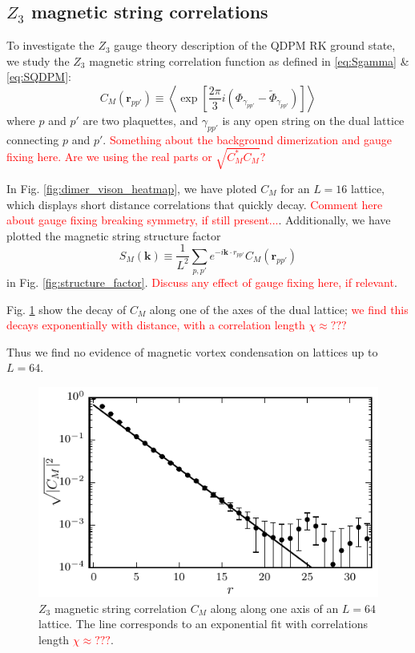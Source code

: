 \documentclass[twocolumn,prb,aps,floatfix,superscriptaddress]{revtex4-1}
\newcommand{\figref}[1]{Fig. \ref{#1}}
\newcommand{\note}[1]{\textcolor{red}{#1}}
\begin{document}
\subsection{$Z_3$ magnetic string correlations}

To investigate the $Z_3$ gauge theory description of the QDPM RK ground state, we study the $Z_3$ magnetic string correlation function as defined in \eqref{eq:Sgamma} \& \eqref{eq:SQDPM}:
\begin{equation}
C_M \left( \bm{r}_{pp'} \right) \equiv \left \langle \exp \left[ \frac{2 \pi}{3} i \left( \Phi_{\gamma_{pp'}} -\tilde{\Phi}_{\gamma_{pp'}} \right) \right] \right \rangle
\end{equation}
where $p$ and $p'$ are two plaquettes, and $\gamma_{pp'}$ is any open string on the dual lattice connecting $p$ and $p'$. \note{Something about the background dimerization and gauge fixing here. Are we using the real parts or $\sqrt{C_M^*C_M}$?}

In \figref{fig:dimer_vison_heatmap}, we have ploted $C_M$ for an $L=16$ lattice, which displays short distance correlations that quickly decay. \note{Comment here about gauge fixing breaking symmetry, if still present...}. Additionally, we have plotted the magnetic string structure factor
\begin{equation}
S_M\left( \bm{k} \right) \equiv \frac{1}{ L^2} \sum_{p,p'} e^{-i \bm{k} \cdot r_{pp'}} C_M\left( \bm{r}_{pp'}\right)
\end{equation}
in \figref{fig:structure_factor}. \note{Discuss any effect of gauge fixing here, if relevant}. 

\figref{fig:vison_cor} show the decay of $C_M$ along one of the axes of the dual lattice; \note{we find this decays exponentially with distance, with a correlation length $\chi\approx???$} 

Thus we find no evidence of magnetic vortex condensation on lattices up to $L=64$.

\begin{figure}
    \centering
    \includegraphics[width=1.0\columnwidth]{spatial_cors_z3_vis.pdf}
    \caption{ $Z_3$ magnetic string correlation $C_M$ along along one axis of an $L=64$ lattice. The line corresponds to an exponential fit with correlations length \note{$\chi\approx???$}.}
    \label{fig:vison_cor}
\end{figure}
\end{document}

